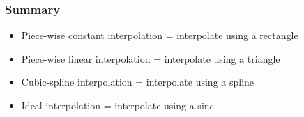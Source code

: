 \documentclass{beamer}
\begin{document}
\begin{frame}
  \frametitle{Summary}
  \begin{itemize}
  \item Piece-wise constant interpolation = interpolate using a rectangle
  \item Piece-wise linear interpolation = interpolate using a triangle
  \item Cubic-spline interpolation = interpolate using a spline
  \item Ideal interpolation = interpolate using a sinc
  \end{itemize}
\end{frame}
\end{document}
